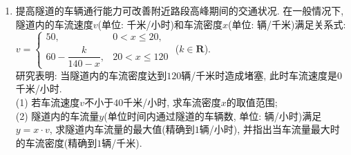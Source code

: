 \documentclass[10pt,a4paper]{article}
\begin{document}
\begin{enumerate}[1.]
\item 提高隧道的车辆通行能力可改善附近路段高峰期间的交通状况. 在一般情况下, 隧道内的车流速度$v$(单位: 千米/小时)和车流密度$x$(单位: 辆/千米)满足关系式:
$v=\begin{cases} 50, & 0<x\le 20, \\ 60-\dfrac k{140-x}, & 20<x\le 120 \end{cases}$ ($k\in \mathbf{R}$).\\
研究表明: 当隧道内的车流密度达到$120$辆/千米时造成堵塞, 此时车流速度是$0$千米/小时.\\
(1) 若车流速度$v$不小于$40$千米/小时, 求车流密度$x$的取值范围;\\
(2) 隧道内的车流量$y$(单位时间内通过隧道的车辆数, 单位: 辆/小时)满足$y=x\cdot v$, 求隧道内车流量的最大值(精确到$1$辆/小时), 并指出当车流量最大时的车流密度(精确到$1$辆/千米).

\end{enumerate}
\end{document}
